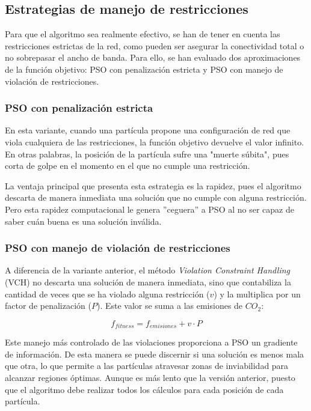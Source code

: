 \subsection{Estrategias de manejo de restricciones}

Para que el algoritmo sea realmente efectivo, se han de tener en cuenta las restricciones estrictas de la red, como pueden ser asegurar la conectividad total o no sobrepasar el ancho de banda. Para ello, se han evaluado dos aproximaciones de la función objetivo: PSO con penalización estricta y PSO con manejo de violación de restricciones.

\subsubsection{PSO con penalización estricta}

En esta variante, cuando una partícula propone una configuración de red que viola cualquiera de las restricciones, la función objetivo devuelve el valor infinito. En otras palabras, la posición de la partícula sufre una "muerte súbita", pues corta de golpe en el momento en el que no cumple una restricción.

La ventaja principal que presenta esta estrategia es la rapidez, pues el algoritmo descarta de manera inmediata una solución que no cumple con alguna restricción. Pero esta rapidez computacional le genera ''ceguera'' a PSO al no ser capaz de saber cuán buena es una solución inválida.

\subsubsection{PSO con manejo de violación de restricciones}

A diferencia de la variante anterior, el método \textit{Violation Constraint Handling} (VCH) no descarta una solución de manera inmediata, sino que contabiliza la cantidad de veces que se ha violado alguna restricción ($v$) y la multiplica por un factor de penalización ($P$). Este valor se suma a las emisiones de $CO_2$:

\begin{equation}
    f_{fitness} = f_{emisiones} + v \cdot P
\end{equation}

Este manejo más controlado de las violaciones proporciona a PSO un gradiente de información. De esta manera se puede discernir si una solución es menos mala que otra, lo que permite a las partículas atravesar zonas de inviabilidad para alcanzar regiones óptimas. Aunque es más lento que la versión anterior, puesto que el algoritmo debe realizar todos los cálculos para cada posición de cada partícula.

